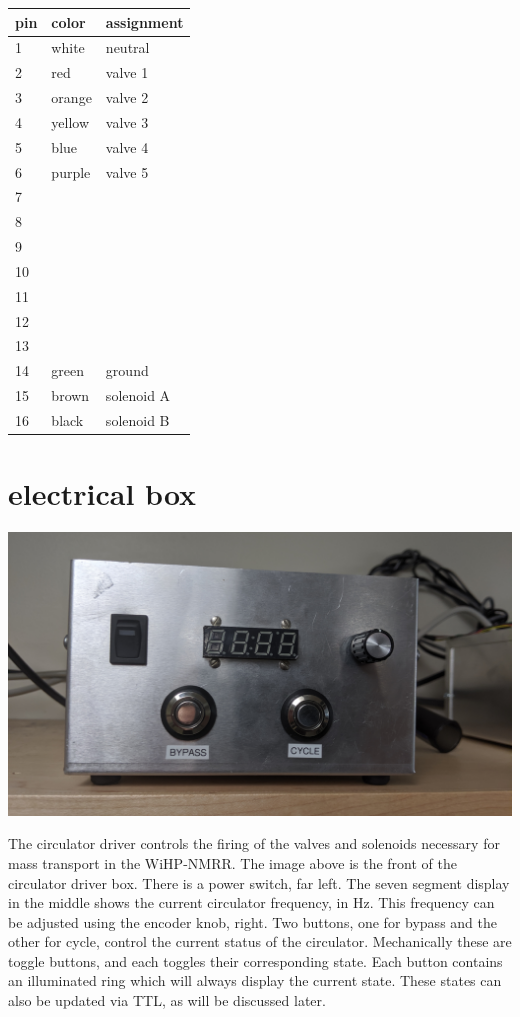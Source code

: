 \documentclass{manual}
\begin{document}
\begin{table}[h]
\begin{tabular}{l|ll}
pin & color & assignment \\ \hline
1 & white & neutral \\
2 & red & valve 1 \\
3 & orange & valve 2 \\
4 & yellow & valve 3 \\
5 & blue & valve 4 \\
6 & purple & valve 5 \\
7 & & \\
8 & & \\
9 & & \\
10 & & \\
11 & & \\
12 & & \\
13 & & \\
14 & green & ground \\
15 & brown & solenoid A \\
16 & black & solenoid B
\end{tabular}
\end{table}

\section{electrical box}

\begin{center}
  \includegraphics[width=0.75\linewidth]{../pictures/2019-10-22_162512}
\end{center}

The circulator driver controls the firing of the valves and solenoids necessary for mass transport in the WiHP-NMRR.
The image above is the front of the circulator driver box.
There is a power switch, far left.
The seven segment display in the middle shows the current circulator frequency, in Hz.
This frequency can be adjusted using the encoder knob, right.
Two buttons, one for bypass and the other for cycle, control the current status of the circulator.
Mechanically these are toggle buttons, and each toggles their corresponding state.
Each button contains an illuminated ring which will always display the current state.
These states can also be updated via TTL, as will be discussed later.
\end{document}
